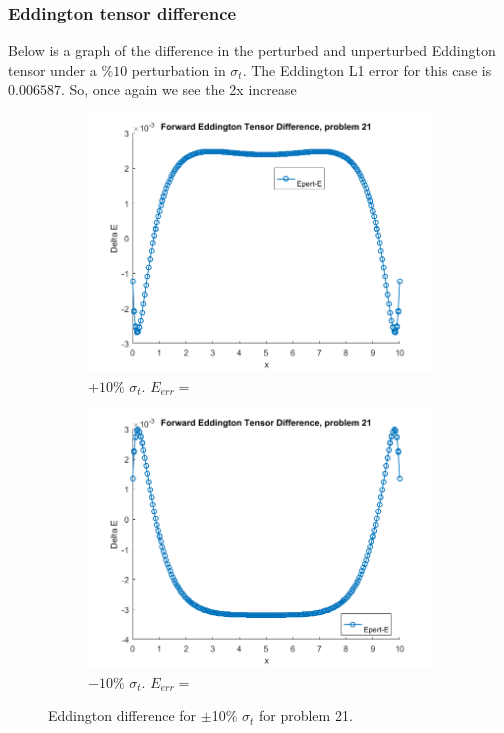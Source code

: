 \documentclass{article}
\begin{document}
\subsubsection{Eddington tensor difference}
Below is a graph of the difference in the perturbed and unperturbed Eddington tensor under a $\% 10$ perturbation in $\sigma_t$. The Eddington L1 error for this case is $0.006587$. So, once again we see the 2x increase
\begin{figure}[H]
\centering
\begin{subfigure}{.5\textwidth}
  \centering
  \includegraphics[width=1\linewidth]{p21deltaE.png}
  \caption{$+10\%$ $\sigma_t$. $E_{err}=$}
  \label{fig:sub1}
\end{subfigure}%
\begin{subfigure}{.5\textwidth}
  \centering
  \includegraphics[width=1\linewidth]{p21deltaEdst-10.png}
  \caption{$-10\%$ $\sigma_t$. $E_{err}=$}
  \label{fig:sub2}
\end{subfigure}
\caption{Eddington difference for $\pm$10$\%$ $\sigma_t$ for problem 21.}
\label{fig:test}
\end{figure}
\end{document}
